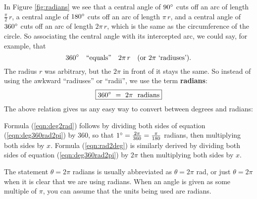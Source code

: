 In Figure \ref{fig:radians} we see that a central angle of $90^\circ$ cuts off an arc of length
$\tfrac{\pi}{2}\,r$, a central angle of $180^\circ$ cuts off an arc of length $\pi\,r$, and a
central angle of $360^\circ$ cuts off an arc of length $2\pi\,r$, which is the same as the
circumference of the circle. So associating the central angle with its intercepted arc, we could
say, for example, that
\begin{displaymath}
 360^\circ \quad\text{``equals''}\quad 2\pi\,r \quad\text{(or $2\pi$ `radiuses').}
\end{displaymath}
The radius $r$ was arbitrary, but the $2\pi$ in front of it stays the same. So instead of using
the awkward ``radiuses'' or ``radii'', we use the term \textbf{radians}:
\begin{equation}\label{eqn:deg360rad2pi}
 \boxed{360^\circ ~=~ 2\pi ~~\text{radians}}
\end{equation}
The above relation gives us any easy way to convert between degrees and radians:

\begin{center}\end{center}
\newpage
Formula (\ref{eqn:deg2rad}) follows by dividing both sides of equation
(\ref{eqn:deg360rad2pi}) by $360$, so that $1^\circ = \frac{2\pi}{360} = \frac{\pi}{180}$ radians,
then multiplying both sides by $x$. Formula (\ref{eqn:rad2deg}) is similarly derived
by dividing both sides of equation (\ref{eqn:deg360rad2pi}) by $2\pi$ then multiplying both sides
by $x$.

The statement $\theta = 2\pi$ radians is usually abbreviated as $\theta = 2\pi$ rad, or
just $\theta = 2\pi$ when it is clear that we are using radians. When an angle is given as some
multiple of $\pi$, you can assume that the units being used are radians.

